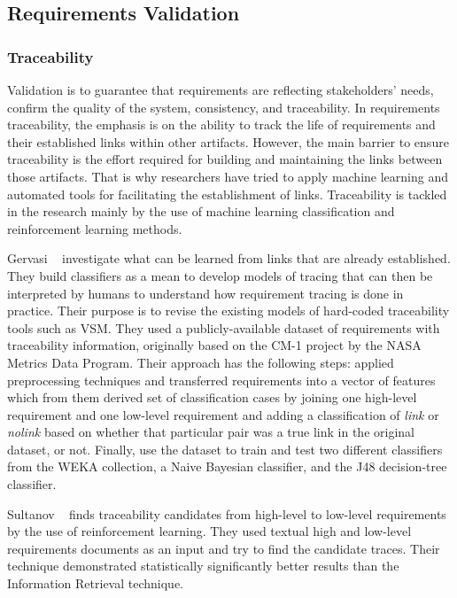 \subsection{Requirements Validation}

\subsubsection{Traceability}

Validation is to guarantee that requirements are reflecting stakeholders' needs,
confirm the quality of the system, consistency, and traceability.
In requirements traceability, the emphasis is on the ability to track the life of
requirements and their established links within other artifacts. However, the
main barrier to ensure traceability is the effort required for building and
maintaining the links between those artifacts. That is why researchers have
tried to apply machine learning and automated tools for facilitating the
establishment of links\cite{Gervasi:2011}.
Traceability is tackled in the research mainly by the use of machine learning
classification and reinforcement learning methods.

Gervasi \etal~\cite{Gervasi:2011} investigate what can be learned from links
that are already established. They build classifiers as a mean to develop models
of tracing that can then be interpreted by humans to understand how requirement
tracing is done in practice. Their purpose is to revise the existing models of
hard-coded traceability tools such as VSM. They used a publicly-available
dataset of requirements with traceability information, originally based on the
CM-1 project by the NASA Metrics Data Program. Their approach has the following
steps: applied preprocessing techniques and transferred requirements into a
vector of features which from them derived set of classification cases by
joining one high-level requirement and one low-level requirement and adding a
classification of \textit{link} or \textit{nolink} based on whether that
particular pair was a true link in the original dataset, or not. Finally, use
the dataset to train and test two different classifiers from the WEKA
collection, a Naive Bayesian classifier, and the J48 decision-tree classifier.

Sultanov \etal~\cite{Sultanov:2013} finds traceability candidates from
high-level to low-level requirements by the use of reinforcement
learning. They used textual high and low-level requirements documents as an input and try to
find the candidate traces. Their technique demonstrated statistically
significantly better results than the Information Retrieval technique.





